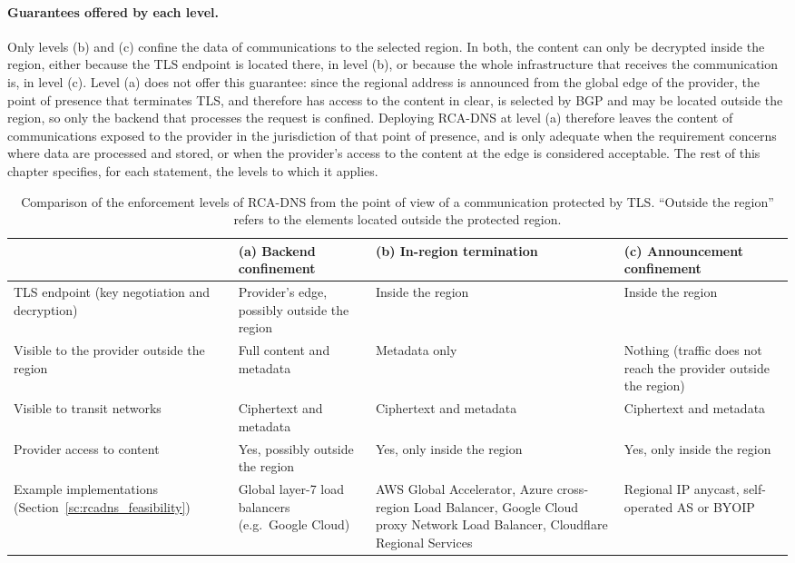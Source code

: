 \paragraph{Guarantees offered by each level.} Only levels (b) and (c) confine the data of communications to the selected region. In both, the content can only be decrypted inside the region, either because the TLS endpoint is located there, in level (b), or because the whole infrastructure that receives the communication is, in level (c). Level (a) does not offer this guarantee: since the regional address is announced from the global edge of the provider, the point of presence that terminates TLS, and therefore has access to the content in clear, is selected by BGP and may be located outside the region, so only the backend that processes the request is confined. Deploying RCA-DNS at level (a) therefore leaves the content of communications exposed to the provider in the jurisdiction of that point of presence, and is only adequate when the requirement concerns where data are processed and stored, or when the provider's access to the content at the edge is considered acceptable. The rest of this chapter specifies, for each statement, the levels to which it applies.

\begin{table}[ht]
    \centering
    \small
    \caption{Comparison of the enforcement levels of RCA-DNS from the point of view of a communication protected by TLS. ``Outside the region'' refers to the elements located outside the protected region.}
    \label{tab:rcadns_enforcement_comparison}
    \begin{tabularx}{\textwidth}{>{\raggedright\arraybackslash}p{3.4cm} >{\raggedright\arraybackslash}X >{\raggedright\arraybackslash}X >{\raggedright\arraybackslash}X}
        \toprule
        & \textbf{(a) Backend confinement} & \textbf{(b) In-region termination} & \textbf{(c) Announcement confinement} \\
        \midrule
        TLS endpoint (key negotiation and decryption) & Provider's edge, possibly outside the region & Inside the region & Inside the region \\
        \rowsep{4}
        Visible to the provider outside the region & Full content and metadata & Metadata only & Nothing (traffic does not reach the provider outside the region) \\
        \rowsep{4}
        Visible to transit networks & Ciphertext and metadata & Ciphertext and metadata & Ciphertext and metadata \\
        \rowsep{4}
        Provider access to content & Yes, possibly outside the region & Yes, only inside the region & Yes, only inside the region \\
        \rowsep{4}
        Example implementations (Section~\ref{sc:rcadns_feasibility}) & Global layer-7 load balancers (e.g.\ Google Cloud) & AWS Global Accelerator, Azure cross-region Load Balancer, Google Cloud proxy Network Load Balancer, Cloudflare Regional Services & Regional IP anycast, self-operated AS or BYOIP \\
        \bottomrule
    \end{tabularx}
\end{table}

